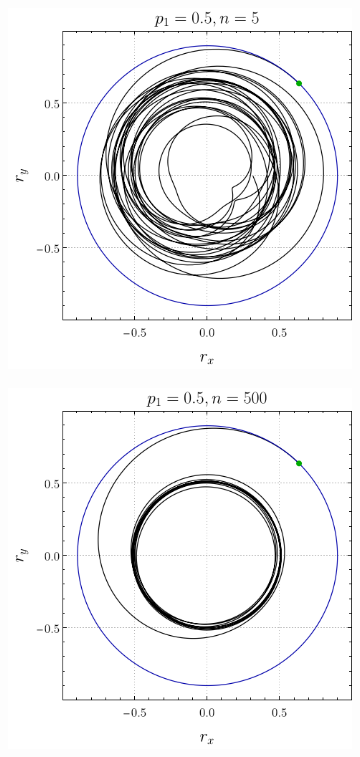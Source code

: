 \begin{figure}[ht!]
    \centering
    \begin{subfigure}{0.5\textwidth}
      \centering
      \includegraphics[width=0.9\linewidth]{chapter3/figures_separable/local_all_ran_p=0.5_r=0.9_n=5_a=-3_b=3.png}
    \end{subfigure}%
    \begin{subfigure}{0.5\textwidth}
      \centering
      \includegraphics[width=0.9\linewidth]{chapter3/figures_separable/local_all_ran_p=0.5_r=0.9_n=500_a=-3_b=3.png}

\end{subfigure}
\end{figure}
